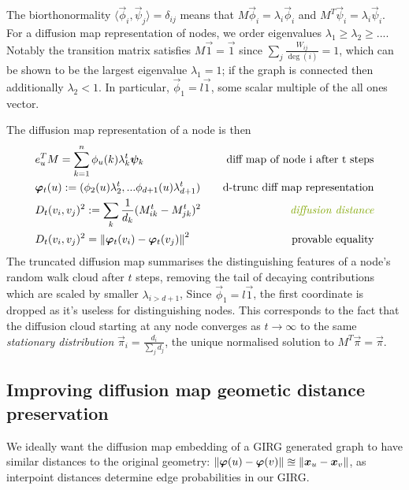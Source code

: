 The biorthonormality $\langle \vec{\phi}_i, \vec{\psi}_j \rangle = \delta_{ij}$ means that $M \vec{\phi}_i = \lambda_i \vec{\phi}_i$ and $M^T \vec{\psi}_i = \lambda_i \vec{\psi}_i$. For a diffusion map representation of nodes, we order eigenvalues $\lambda_1 \geq \lambda_2 \geq ...$.
Notably the transition matrix satisfies $M\vec{1} = \vec{1}$ since $\sum_j \frac{W_{ij}}{\deg(i)} = 1$, which can be shown to be the largest eigenvalue $\lambda_1=1$; if the graph is connected then additionally $\lambda_2 < 1$. In particular, $\vec{\phi}_1 = l \vec{1}$, some scalar multiple of the all ones vector.

The diffusion map representation of a node is then
\begin{align*}
  & e_u^T M = \sum_{k=1}^n \phi_u(k) \lambda_k^t \vec{\psi}_k \quad & \text{diff map of node i after t steps}\\
  & \vec{\varphi}_t(u) := (\phi_2(u) \lambda_2^t,... \phi_{d+1}(u) \lambda_{d+1}^t) 
  \quad & \text{d-trunc diff map representation}
  \\
  & D_t(v_i, v_j)^2 := \sum_k \frac{1}{d_k} (M^t_{ik} - M^t_{jk})^2
  \quad & \text{\textit{diffusion distance}}
  \\
  & D_t(v_i, v_j)^2 = \norm{\vec{\varphi}_t(v_i) - \vec{\varphi}_t(v_j)}^2
  \quad & \text{provable equality}
\end{align*}
%
The truncated diffusion map summarises the distinguishing features of a node's random walk cloud after $t$ steps, removing the tail of decaying contributions which are scaled by smaller $\lambda_{i > d+1}$,
Since $\vec{\phi}_1 = l \vec{1}$, the first coordinate is dropped as it's useless for distinguishing nodes. This corresponds to the fact that the diffusion cloud starting at any node converges as $t \to \infty$ to the same \textit{stationary distribution} $\vec{\pi}_i = \frac{d_i}{\sum_j d_j}$, the unique normalised solution to $M^T \vec{\pi} = \vec{\pi}$.

\subsection{Improving diffusion map geometic distance preservation}
\label{sec:diff_map_geometry}
We ideally want the diffusion map embedding of a GIRG generated graph to have similar distances to the original geometry: $\left\lVert \bm{\varphi}(u) - \bm{\varphi}(v)\right\rVert \approxeq \left\lVert \bm{x}_u - \bm{x}_v\right\rVert$, as interpoint distances determine edge probabilities in our GIRG.

